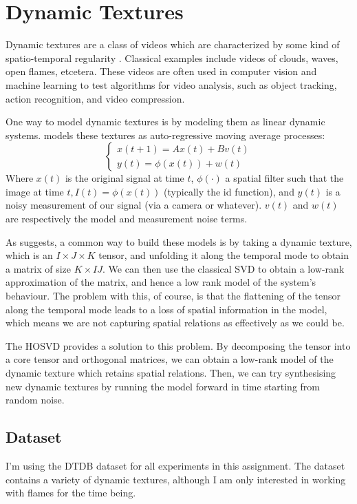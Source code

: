 \documentclass{article}
\begin{document}
\section{Dynamic Textures}
Dynamic textures are a class of videos which are characterized by some kind of spatio-temporal regularity \cite{dynamic}. Classical examples include videos of clouds, waves, open flames, etcetera. These videos are often used in computer vision and machine learning to test algorithms for video analysis, such as object tracking, action recognition, and video compression.\bigskip

One way to model dynamic textures is by modeling them as linear dynamic systems. \cite{dynamic} models these textures as auto-regressive moving average processes:
\begin{equation}
	\left\{ 
	\begin{array}{l}
		x(t + 1) = Ax(t) + Bv(t)\\
		y(t) = \phi(x(t)) + w(t)
	\end{array} 
	\right.
\end{equation} 
Where $x(t)$ is the original signal at time $t$, $\phi(\cdot)$ a spatial filter such that the image at time $t, I(t) = \phi(x(t))$ (typically the id function), and $y(t)$ is a noisy measurement of our signal (via a camera or whatever). $v(t)$ and $w(t)$ are respectively the model and measurement noise terms. \bigskip

As \cite{synthesis} suggests, a common way to build these models is by taking a dynamic texture, which is an $I \times J \times K$ tensor, and unfolding it along the temporal mode to obtain a matrix of size $K \times IJ$. We can then use the classical SVD to obtain a low-rank approximation of the matrix, and hence a low rank model of the system's behaviour. The problem with this, of course, is that the flattening of the tensor along the temporal mode leads to a loss of spatial information in the model, which means we are not capturing spatial relations as effectively as we could be.\bigskip

The HOSVD provides a solution to this problem. By decomposing the tensor into a core tensor and orthogonal matrices, we can obtain a low-rank model of the dynamic texture which retains spatial relations. Then, we can try synthesising new dynamic textures by running the model forward in time starting from random noise.

\subsection{Dataset}
I'm using the DTDB\cite{DTDB} dataset for all experiments in this assignment. The dataset contains a variety of dynamic textures, although I am only interested in working with flames for the time being.\bigskip
\end{document}
